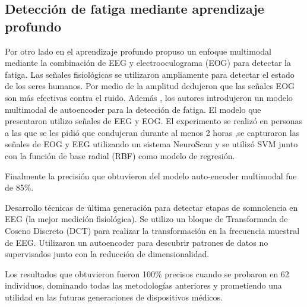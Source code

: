 \subsection{Detección de fatiga mediante aprendizaje profundo}
Por otro lado en el aprendizaje profundo
\cite{du2017detecting} propuso un enfoque multimodal mediante la combinación de EEG y electrooculograma (EOG) para detectar la fatiga. Las señales fisiológicas se utilizaron ampliamente para detectar el estado de los seres humanos.
Por medio de  la amplitud dedujeron  que las  señales  EOG son más efectivas contra el ruido.   %
Además , los autores introdujeron un modelo  multimodal de autoencoder  para la detección de fatiga. El modelo que presentaron  utilizo señales de EEG y EOG. El experimento se realizó en personas a las que se les pidió que condujeran durante al menos 2 horas ,se capturaron las señales de EOG y EEG utilizando un sistema NeuroScan y se utilizó SVM junto con la función de base radial (RBF) como modelo de regresión.



Finalmente la precisión que obtuvieron  del modelo    auto-encoder multimodal   fue de 85\%.


\cite{computation7010013}  Desarrollo técnicas de última generación para detectar etapas de somnolencia en EEG (la mejor medición fisiológica). Se utilizo un bloque de Transformada de Coseno Discreto (DCT) para realizar la transformación en la frecuencia muestral de EEG. Utilizaron un autoencoder para descubrir patrones de datos no supervisados junto con la reducción de dimensionalidad.

Los resultados que obtuvieron    fueron 100\% precisos cuando se probaron en 62 individuos, dominando todas las metodologías anteriores y prometiendo una utilidad en las futuras generaciones de dispositivos médicos.




